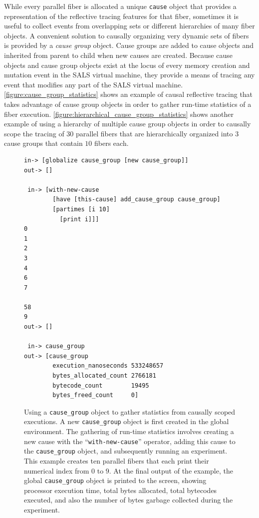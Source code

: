 While every parallel fiber is allocated a unique {\tt{cause}} object
that provides a representation of the reflective tracing features for
that fiber, sometimes it is useful to collect events from overlapping
sets or different hierarchies of many fiber objects.  A convenient
solution to causally organizing very dynamic sets of fibers is
provided by a {\emph{cause group}} object.  Cause groups are added to
cause objects and inherited from parent to child when new causes are
created.  Because cause objects and cause group objects exist at the
locus of every memory creation and mutation event in the SALS virtual
machine, they provide a means of tracing any event that modifies any
part of the SALS virtual machine.
{\mbox{\autoref{figure:cause_group_statistics}}} shows an example of
causal reflective tracing that takes advantage of cause group objects
in order to gather run-time statistics of a fiber execution.
{\mbox{\autoref{figure:hierarchical_cause_group_statistics}}} shows
another example of using a hierarchy of multiple cause group objects
in order to causally scope the tracing of $30$ parallel fibers that
are hierarchically organized into $3$ cause groups that contain $10$
fibers each.
\begin{figure}[h]
\centering
{\scriptsize
\begin{Verbatim}[frame=single]
 in-> [globalize cause_group [new cause_group]]
out-> []

 in-> [with-new-cause
        [have [this-cause] add_cause_group cause_group]
        [partimes [i 10]
          [print i]]]
0
1
2
3
4
6
7

58
9
out-> []

 in-> cause_group
out-> [cause_group
        execution_nanoseconds 533248657
        bytes_allocated_count 2766181
        bytecode_count        19495
        bytes_freed_count     0]
\end{Verbatim}
}
\caption[Using a {\tt{cause\_group}} object to gather statistics from
  causally scoped executions.]{Using a {\tt{cause\_group}} object to
  gather statistics from causally scoped executions.  A new
  {\tt{cause\_group}} object is first created in the global
  environment.  The gathering of run-time statistics involves creating
  a new cause with the ``{\tt{with-new-cause}}'' operator, adding this
  cause to the {\tt{cause\_group}} object, and subsequently running an
  experiment.  This example creates ten parallel fibers that each
  print their numerical index from $0$ to $9$.  At the final output of
  the example, the global {\tt{cause\_group}} object is printed to the
  screen, showing processor execution time, total bytes allocated,
  total bytecodes executed, and also the number of bytes garbage
  collected during the experiment.}
\label{figure:cause_group_statistics}
\end{figure}
